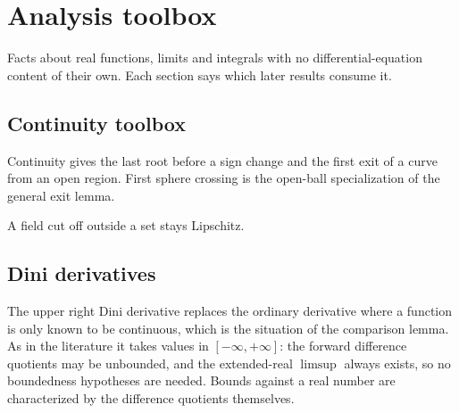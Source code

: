 

\chapter{Analysis toolbox}

Facts about real functions, limits and integrals with no differential-equation content of their
own.  Each section says which later results consume it.

\section{Continuity toolbox}

Continuity gives the last root before a sign change and the first exit of a curve from an
open region. First sphere crossing is the open-ball specialization of the general exit lemma.




A field cut off outside a set stays Lipschitz.


\section{Dini derivatives}

The upper right Dini derivative replaces the ordinary derivative where a function is only known
to be continuous, which is the situation of the comparison lemma. As in the literature it takes
values in $[-\infty, +\infty]$: the forward difference quotients may be unbounded, and the
extended-real $\limsup$ always exists, so no boundedness hypotheses are needed. Bounds against a
real number are characterized by the difference quotients themselves.

